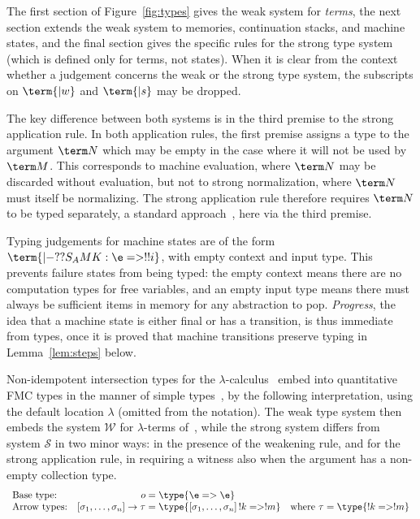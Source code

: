 \documentclass[a4paper,UKenglish,cleveref, autoref, thm-restate]{lipics-v2021}
\begin{document}
The first section of Figure~\ref{fig:types} gives the weak system for \emph{terms}, the next section extends the weak system to memories, continuation stacks, and machine states, and the final section gives the specific rules for the strong type system (which is defined only for terms, not states). When it is clear from the context whether a judgement concerns the weak or the strong type system, the subscripts on $\term{|w}$ and $\term{|s}$ may be dropped.

The key difference between both systems is in the third premise to the strong application rule. In both application rules, the first premise assigns a type to the argument $\term N$ which may be empty in the case where it will not be used by $\term M$. This corresponds to machine evaluation, where $\term N$ may be discarded without evaluation, but not to strong normalization, where $\term N$ must itself be normalizing. The strong application rule therefore requires $\term N$ to be typed separately, a standard approach~\cite{Bono-Dezani-2020,Bucciarelli-Kesner-Ventura-2017}, here via the third premise.

Typing judgements for machine states are of the form $\term{|- ??{S_A}MK : \e=>!!i}$, with empty context and input type. This prevents failure states from being typed: the empty context means there are no computation types for free variables, and an empty input type means there must always be sufficient items in memory for any abstraction to pop. \emph{Progress}, the idea that a machine state is either final or has a transition, is thus immediate from types, once it is proved that machine transitions preserve typing in Lemma~\ref{lem:steps} below.

Non-idempotent intersection types for the $\lambda$-calculus~\cite{Bucciarelli-Kesner-Ventura-2017} embed into quantitative FMC types in the manner of simple types~\cite{Heijltjes-2022}, by the following interpretation, using the default location $\lambda$ (omitted from the notation). The weak type system then embeds the system $\mathcal W$ for $\lambda$-terms of~\cite{Bucciarelli-Kesner-Ventura-2017}, while the strong system differs from system $\mathcal S$ in two minor ways: in the presence of the weakening rule, and for the strong application rule, in requiring a witness also when the argument has a non-empty collection type.
\[
\begin{array}{lr@{}l}
	\text{Base type:}      &                                  o &{}= \type{\e=>\e}
\\	\text{Arrow types:}    & [\sigma_1,\dots,\sigma_n] \to \tau &{}= \type{[\sigma_1,\dots,\sigma_n]\,!k => !m} \quad\text{where}~\tau=\type{!k => !m}
\end{array}
\]
\end{document}
